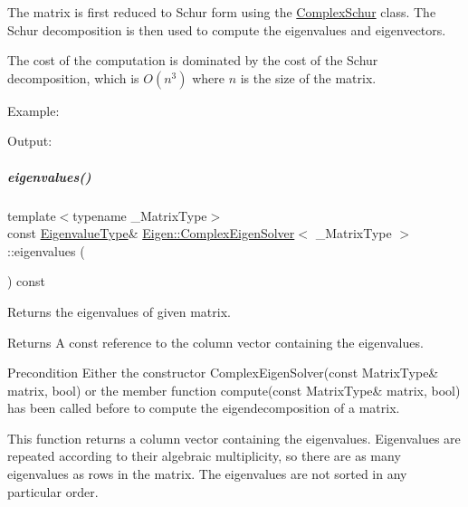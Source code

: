 The matrix is first reduced to Schur form using the \hyperlink{group___eigenvalues___module_class_eigen_1_1_complex_schur}{Complex\+Schur} class. The Schur decomposition is then used to compute the eigenvalues and eigenvectors.

The cost of the computation is dominated by the cost of the Schur decomposition, which is $ O(n^3) $ where $ n $ is the size of the matrix.

Example\+: 
\begin{DoxyCodeInclude}
\end{DoxyCodeInclude}
 Output\+: 
\begin{DoxyVerbInclude}
\end{DoxyVerbInclude}
 \mbox{\label{group___eigenvalues___module_a10c25c7620e7faedcd39991cce3a757b}} 
\subparagraph{\texorpdfstring{eigenvalues()}{eigenvalues()}\hspace{0.1cm}{\footnotesize\ttfamily [1/2]}}
{\footnotesize\ttfamily template$<$typename \+\_\+\+Matrix\+Type$>$ \\
const \hyperlink{group___eigenvalues___module_ad3a663b1ff5200a098dabbbf9b7162b1}{Eigenvalue\+Type}\& \hyperlink{group___eigenvalues___module_class_eigen_1_1_complex_eigen_solver}{Eigen\+::\+Complex\+Eigen\+Solver}$<$ \+\_\+\+Matrix\+Type $>$\+::eigenvalues (\begin{DoxyParamCaption}{ }\end{DoxyParamCaption}) const\hspace{0.3cm}{\ttfamily [inline]}}



Returns the eigenvalues of given matrix. 

\begin{DoxyReturn}{Returns}
A const reference to the column vector containing the eigenvalues.
\end{DoxyReturn}
\begin{DoxyPrecond}{Precondition}
Either the constructor Complex\+Eigen\+Solver(const Matrix\+Type\& matrix, bool) or the member function compute(const Matrix\+Type\& matrix, bool) has been called before to compute the eigendecomposition of a matrix.
\end{DoxyPrecond}
This function returns a column vector containing the eigenvalues. Eigenvalues are repeated according to their algebraic multiplicity, so there are as many eigenvalues as rows in the matrix. The eigenvalues are not sorted in any particular order.


